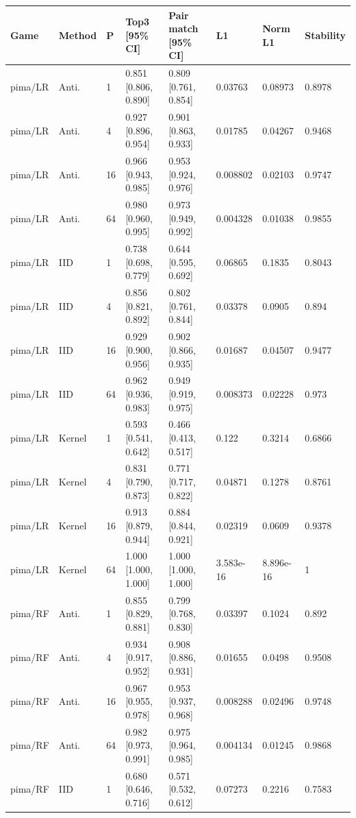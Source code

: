 \begingroup\footnotesize\setlength{\tabcolsep}{3pt}
\begin{tabular}{llllllll}
\toprule
Game & Method & P & Top3 [95\% CI] & Pair match [95\% CI] & L1 & Norm L1 & Stability \\
\midrule
pima/LR & Anti. & 1 & 0.851 [0.806, 0.890] & 0.809 [0.761, 0.854] & 0.03763 & 0.08973 & 0.8978 \\
pima/LR & Anti. & 4 & 0.927 [0.896, 0.954] & 0.901 [0.863, 0.933] & 0.01785 & 0.04267 & 0.9468 \\
pima/LR & Anti. & 16 & 0.966 [0.943, 0.985] & 0.953 [0.924, 0.976] & 0.008802 & 0.02103 & 0.9747 \\
pima/LR & Anti. & 64 & 0.980 [0.960, 0.995] & 0.973 [0.949, 0.992] & 0.004328 & 0.01038 & 0.9855 \\
pima/LR & IID & 1 & 0.738 [0.698, 0.779] & 0.644 [0.595, 0.692] & 0.06865 & 0.1835 & 0.8043 \\
pima/LR & IID & 4 & 0.856 [0.821, 0.892] & 0.802 [0.761, 0.844] & 0.03378 & 0.0905 & 0.894 \\
pima/LR & IID & 16 & 0.929 [0.900, 0.956] & 0.902 [0.866, 0.935] & 0.01687 & 0.04507 & 0.9477 \\
pima/LR & IID & 64 & 0.962 [0.936, 0.983] & 0.949 [0.919, 0.975] & 0.008373 & 0.02228 & 0.973 \\
pima/LR & Kernel & 1 & 0.593 [0.541, 0.642] & 0.466 [0.413, 0.517] & 0.122 & 0.3214 & 0.6866 \\
pima/LR & Kernel & 4 & 0.831 [0.790, 0.873] & 0.771 [0.717, 0.822] & 0.04871 & 0.1278 & 0.8761 \\
pima/LR & Kernel & 16 & 0.913 [0.879, 0.944] & 0.884 [0.844, 0.921] & 0.02319 & 0.0609 & 0.9378 \\
pima/LR & Kernel & 64 & 1.000 [1.000, 1.000] & 1.000 [1.000, 1.000] & 3.583e-16 & 8.896e-16 & 1 \\
pima/RF & Anti. & 1 & 0.855 [0.829, 0.881] & 0.799 [0.768, 0.830] & 0.03397 & 0.1024 & 0.892 \\
pima/RF & Anti. & 4 & 0.934 [0.917, 0.952] & 0.908 [0.886, 0.931] & 0.01655 & 0.0498 & 0.9508 \\
pima/RF & Anti. & 16 & 0.967 [0.955, 0.978] & 0.953 [0.937, 0.968] & 0.008288 & 0.02496 & 0.9748 \\
pima/RF & Anti. & 64 & 0.982 [0.973, 0.991] & 0.975 [0.964, 0.985] & 0.004134 & 0.01245 & 0.9868 \\
pima/RF & IID & 1 & 0.680 [0.646, 0.716] & 0.571 [0.532, 0.612] & 0.07273 & 0.2216 & 0.7583 \\

\end{tabular}
